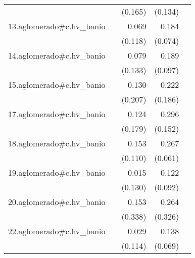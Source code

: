 {\begin{longtable}{l*{4}{D{.}{.}{-1}}}
            &                     &     (0.165)         &     (0.134)         &                     \\
\addlinespace
13.aglomerado#c.hv\_banio&                     &       0.069         &       0.184\sym{*}  &                     \\
            &                     &     (0.118)         &     (0.074)         &                     \\
\addlinespace
14.aglomerado#c.hv\_banio&                     &       0.079         &       0.189         &                     \\
            &                     &     (0.133)         &     (0.097)         &                     \\
\addlinespace
15.aglomerado#c.hv\_banio&                     &       0.130         &       0.222         &                     \\
            &                     &     (0.207)         &     (0.186)         &                     \\
\addlinespace
17.aglomerado#c.hv\_banio&                     &       0.124         &       0.296         &                     \\
            &                     &     (0.179)         &     (0.152)         &                     \\
\addlinespace
18.aglomerado#c.hv\_banio&                     &       0.153         &       0.267\sym{***}&                     \\
            &                     &     (0.110)         &     (0.061)         &                     \\
\addlinespace
19.aglomerado#c.hv\_banio&                     &       0.015         &       0.122         &                     \\
            &                     &     (0.130)         &     (0.092)         &                     \\
\addlinespace
20.aglomerado#c.hv\_banio&                     &       0.153         &       0.264         &                     \\
            &                     &     (0.338)         &     (0.326)         &                     \\
\addlinespace
22.aglomerado#c.hv\_banio&                     &       0.029         &       0.138\sym{*}  &                     \\
            &                     &     (0.114)         &     (0.069)         &                     \\

\end{longtable}}
